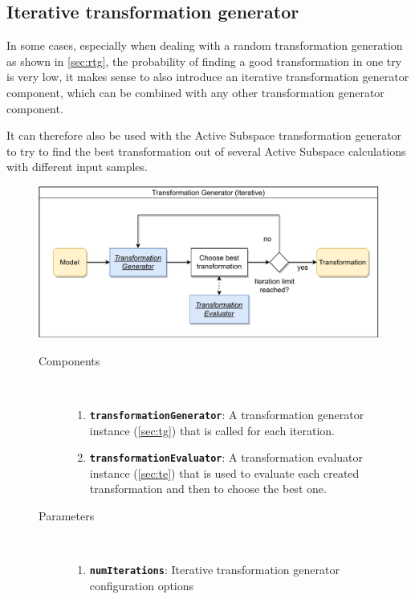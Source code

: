 \documentclass[
  a4paper,  %
  twoside,  %
  bibliography=totoc,
  headsepline,
  cleardoublepage=empty,
  parskip=half,
  draft=false
]{scrbook}
\begin{document}
\newpage

\subsection {Iterative transformation generator}

In some cases, especially when dealing with a random transformation generation as shown in \ref{sec:rtg}, the probability of finding a good transformation in one try is very low, it makes sense to also introduce an iterative transformation generator component, which can be combined with any other transformation generator component.

It can therefore also be used with the Active Subspace transformation generator to try to find the best transformation out of several Active Subspace calculations with different input samples.

\begin{figure}[H]
	\includegraphics[width=\textwidth]{graphics/TransformationGen_Iterative.pdf}

\vspace{-1.5mm}

\begin{mdframed}[linewidth=0.7px]

\begin{description}
\item[Components] {~ \begin{enumerate}[\indent{}]
\item \texttt{\textbf{transformationGenerator}}: A transformation generator instance (\ref{sec:tg}) that is called for each iteration.
\item \texttt{\textbf{transformationEvaluator}}: A transformation evaluator instance (\ref{sec:te}) that is used to evaluate each created transformation and then to choose the best one.
\end{enumerate}}

\item[Parameters] {~ \begin{enumerate}[\indent{}]
\item \texttt{\textbf{numIterations}}: Iterative transformation generator configuration options
\end{enumerate}}
\end{description}

\end{mdframed}
\end{figure}
\end{document}

